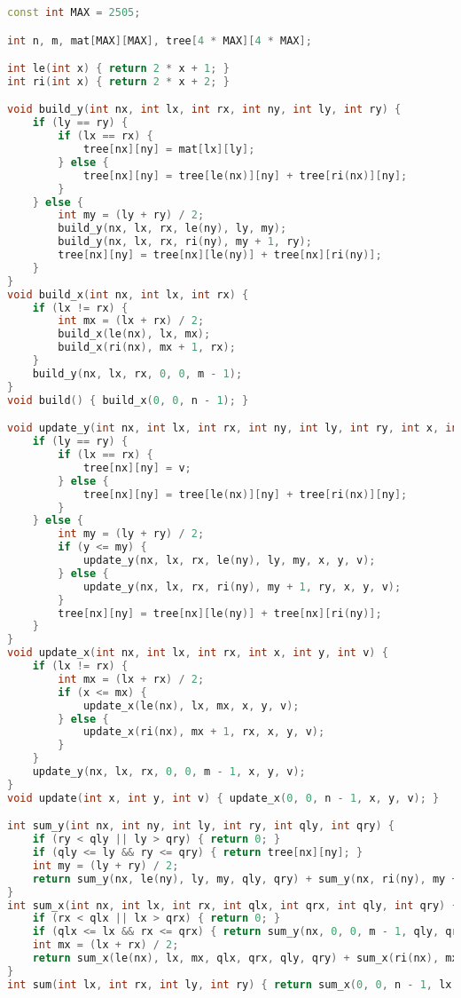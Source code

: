 \documentclass[11pt, a4paper, twoside]{article}
\begin{document}
\begin{lstlisting}[language=C++]
const int MAX = 2505;

int n, m, mat[MAX][MAX], tree[4 * MAX][4 * MAX];

int le(int x) { return 2 * x + 1; }
int ri(int x) { return 2 * x + 2; }

void build_y(int nx, int lx, int rx, int ny, int ly, int ry) {
    if (ly == ry) {
        if (lx == rx) {
            tree[nx][ny] = mat[lx][ly];
        } else {
            tree[nx][ny] = tree[le(nx)][ny] + tree[ri(nx)][ny];
        }
    } else {
        int my = (ly + ry) / 2;
        build_y(nx, lx, rx, le(ny), ly, my);
        build_y(nx, lx, rx, ri(ny), my + 1, ry);
        tree[nx][ny] = tree[nx][le(ny)] + tree[nx][ri(ny)];
    }
}
void build_x(int nx, int lx, int rx) {
    if (lx != rx) {
        int mx = (lx + rx) / 2;
        build_x(le(nx), lx, mx);
        build_x(ri(nx), mx + 1, rx);
    }
    build_y(nx, lx, rx, 0, 0, m - 1);
}
void build() { build_x(0, 0, n - 1); }

void update_y(int nx, int lx, int rx, int ny, int ly, int ry, int x, int y, int v) {
    if (ly == ry) {
        if (lx == rx) {
            tree[nx][ny] = v;
        } else {
            tree[nx][ny] = tree[le(nx)][ny] + tree[ri(nx)][ny];
        }
    } else {
        int my = (ly + ry) / 2;
        if (y <= my) {
            update_y(nx, lx, rx, le(ny), ly, my, x, y, v);
        } else {
            update_y(nx, lx, rx, ri(ny), my + 1, ry, x, y, v);
        }
        tree[nx][ny] = tree[nx][le(ny)] + tree[nx][ri(ny)];
    }
}
void update_x(int nx, int lx, int rx, int x, int y, int v) {
    if (lx != rx) {
        int mx = (lx + rx) / 2;
        if (x <= mx) {
            update_x(le(nx), lx, mx, x, y, v);
        } else {
            update_x(ri(nx), mx + 1, rx, x, y, v);
        }
    }
    update_y(nx, lx, rx, 0, 0, m - 1, x, y, v);
}
void update(int x, int y, int v) { update_x(0, 0, n - 1, x, y, v); }

int sum_y(int nx, int ny, int ly, int ry, int qly, int qry) {
    if (ry < qly || ly > qry) { return 0; }
    if (qly <= ly && ry <= qry) { return tree[nx][ny]; }
    int my = (ly + ry) / 2;
    return sum_y(nx, le(ny), ly, my, qly, qry) + sum_y(nx, ri(ny), my + 1, ry, qly, qry);
}
int sum_x(int nx, int lx, int rx, int qlx, int qrx, int qly, int qry) {
    if (rx < qlx || lx > qrx) { return 0; }
    if (qlx <= lx && rx <= qrx) { return sum_y(nx, 0, 0, m - 1, qly, qry); }
    int mx = (lx + rx) / 2;
    return sum_x(le(nx), lx, mx, qlx, qrx, qly, qry) + sum_x(ri(nx), mx + 1, rx, qlx, qrx, qly, qry);
}
int sum(int lx, int rx, int ly, int ry) { return sum_x(0, 0, n - 1, lx, rx, ly, ry); }
\end{lstlisting}
\end{document}
